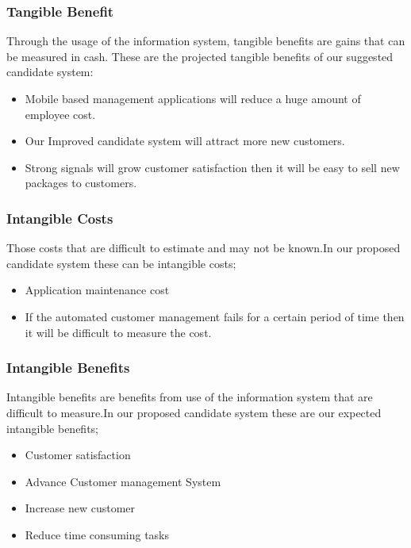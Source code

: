 \begin{spacing}{1}
\subsubsection{Tangible Benefit}
Through the usage of the information system, tangible benefits are gains that can be measured in cash.
These are the projected tangible benefits of our suggested candidate system:

\begin{itemize}
\item Mobile based management applications will reduce a huge amount of employee cost.
\item Our Improved candidate system will attract more new customers.
\item Strong signals will grow customer satisfaction then it will be easy to sell new packages to customers.
\end{itemize}


\subsubsection {Intangible Costs }
Those costs that are difficult to estimate and may not be known.In our proposed candidate system these can be  intangible costs;
\begin{itemize}
\item Application maintenance cost
\item If the automated customer management fails for a certain period of time then it will be difficult to measure the cost.
\end{itemize}

\subsubsection{Intangible Benefits }
Intangible benefits are benefits from use of the information system that are difficult to measure.In our proposed candidate system these are our expected intangible benefits;

\begin{itemize}
\item Customer satisfaction
\item Advance Customer management System
\item Increase new customer 
\item Reduce time consuming tasks
\end{itemize}


\end{spacing}
